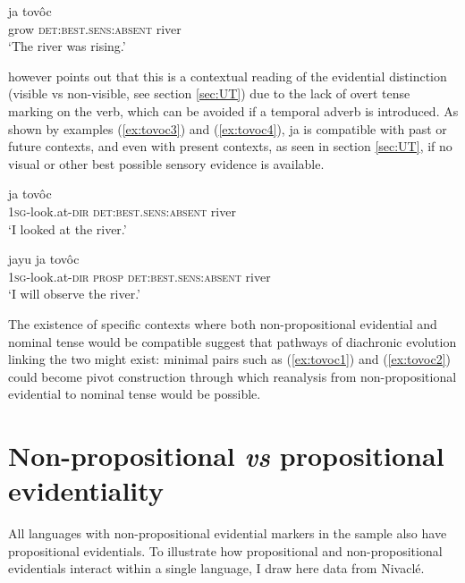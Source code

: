 \documentclass[oneside,a4paper,11pt]{article}
\newcommand{\ipa}[1]{{\phon \mbox{#1}}} %
\begin{document}
\begin{exe}
\ex \label{ex:tovoc2}
\gll \ipa{tsej} \ipa{ja} \ipa{tovôc} \\
 grow \textsc{det:best.sens:absent} river \\
\glt `The river was rising.'
\end{exe}

\citet{gutierrez14determiners} however points out that this is a contextual reading of the evidential distinction (visible vs non-visible, see section \ref{sec:UT}) due to the lack of overt tense marking on the verb, which can be avoided if a temporal adverb is introduced. As shown by examples (\ref{ex:tovoc3}) and (\ref{ex:tovoc4}), \ipa{ja} is compatible with past or future contexts, and even with present contexts, as seen in section \ref{sec:UT}, if no visual or other best possible sensory evidence is available.


\begin{exe}
\ex \label{ex:tovoc3}
\gll \ipa{j-ovalh-ei} \ipa{ja} \ipa{tovôc} \\
 \textsc{1sg}-look.at-\textsc{dir} \textsc{det:best.sens:absent} river \\
\glt `I looked at the river.'
\end{exe}

\begin{exe}
\ex \label{ex:tovoc4}
\gll \ipa{j-ovalh-ei}  \ipa{jayu}   \ipa{ja} \ipa{tovôc} \\
 \textsc{1sg}-look.at-\textsc{dir} \textsc{prosp} \textsc{det:best.sens:absent} river \\
\glt `I will observe the river.'
\end{exe}

The existence of specific contexts where both non-propositional evidential and nominal tense would be compatible suggest that  pathways of diachronic evolution linking the two might exist: minimal pairs such as (\ref{ex:tovoc1}) and (\ref{ex:tovoc2}) could become pivot construction through which reanalysis from non-propositional evidential to nominal tense would be possible.

\section{Non-propositional \textit{vs} propositional evidentiality} \label{sec:prop}
 All languages with non-propositional evidential markers in the sample also have propositional evidentials. To illustrate how propositional and non-propositional evidentials interact within a single language, I draw here data from Nivaclé.
 
\end{document}
